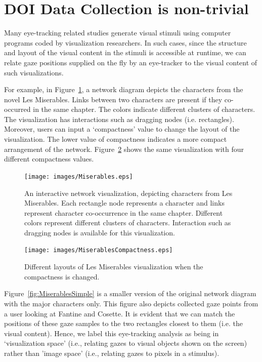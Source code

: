 \section{DOI Data Collection is non-trivial}
\label{sec:DOINonTrivial}
Many eye-tracking related studies generate visual stimuli using computer programs coded by visualization researchers. In such cases, since the structure and layout of the visual content in the stimuli is accessible at runtime, we can relate gaze positions supplied on the fly by an eye-tracker to the visual content of such visualizations.

For example, in Figure~\ref{fig:Miserables}, a network diagram depicts the characters from the novel Les Miserables. Links between two characters are present if they co-occurred in the same chapter. The colors indicate different clusters of characters. The visualization has interactions such as dragging nodes (i.e. rectangles). Moreover, users can input a `compactness' value to change the layout of the visualization. The lower value of compactness indicates a more compact arrangement of the network. Figure~\ref{fig:MiserablesCompactness} shows the same visualization with four different compactness values. 


\begin{figure}[htbp]
  \centering
  \texttt{[image: images/Miserables.eps]}
  \caption{An interactive network visualization, depicting characters from Les Miserables. Each rectangle node represents a character and links represent character co-occurrence in the same chapter. Different colors represent different clusters of characters. Interaction such as dragging nodes is available for this visualization.}
    \label{fig:Miserables}
\end{figure}

\begin{figure}[htbp]
  \centering
  \texttt{[image: images/MiserablesCompactness.eps]}
  \caption{Different layouts of Les Miserables visualization when the compactness is changed.}
    \label{fig:MiserablesCompactness}
\end{figure}

Figure~\ref{fig:MiserablesSimple} is a smaller version of the original network diagram with the major characters only. This figure also depicts collected gaze points from a user looking at Fantine and Cosette. It is evident that we can match the positions of these gaze samples to the two rectangles closest to them (i.e. the visual content). Hence, we label this eye-tracking analysis as being in `visualization space' (i.e., relating gazes to visual objects shown on the screen) rather than 'image space' (i.e., relating gazes to pixels in a stimulus).


